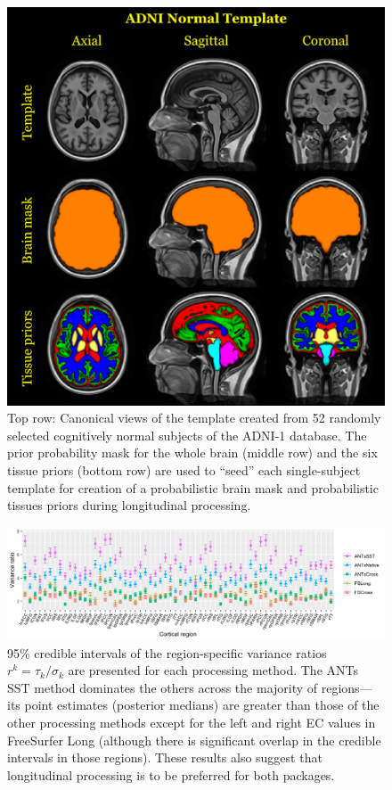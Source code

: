 \documentclass[11pt,table]{article}
\begin{document}
\begin{figure}
\centering
\includegraphics[width=\textwidth]{Figure4.pdf}
\caption{Top row:  Canonical views of the template created from 52 randomly selected
cognitively normal subjects
of the ADNI-1 database.  The prior probability mask for the whole brain (middle row)
and the six tissue priors (bottom row) are used to ``seed'' each single-subject template for creation of
a probabilistic brain mask and probabilistic tissues priors during longitudinal
processing.}
\label{fig:template}
\end{figure}

\newpage

\begin{figure}
\centering
\includegraphics[width=\textwidth]{Figure6.pdf}
\caption{95\% credible intervals of the region-specific variance ratios
$r^k=\tau_k/\sigma_k$ are presented for each processing method.  The ANTs
SST method dominates the others across the majority of
regions---its point estimates (posterior medians) are greater than those of the other
processing methods except for the left and right EC values in
FreeSurfer Long (although there is significant overlap in the credible intervals
in those regions).
These results also suggest that longitudinal processing is to be
preferred for both packages.}
\label{fig:ratios}
\end{figure}
\end{document}
